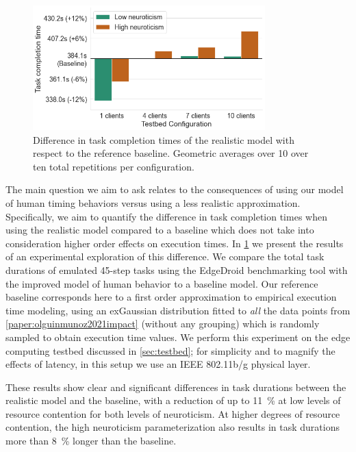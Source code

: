 \begin{figure}
    \centering
    \includegraphics[height=13em]{Figs/2023EdgeDroid2/task_durations_diff}
    \caption{Difference in task completion times of the realistic model with respect to the reference baseline.
    Geometric averages over \num{10} over ten total repetitions per configuration.}\label{fig:taskcompletiontimesdiff}
\end{figure}

The main question we aim to ask relates to the consequences of using our model of human timing behaviors versus using a less realistic approximation.
Specifically, we aim to quantify the difference in task completion times when using the realistic model compared to a baseline which does not take into consideration higher order effects on execution times.
In \cref{fig:taskcompletiontimesdiff} we present the results of an experimental exploration of this difference.
We compare the total task durations of emulated \num{45}-step tasks using the EdgeDroid benchmarking tool with the improved model of human behavior to a baseline model.
Our reference baseline corresponds here to a first order approximation to empirical execution time modeling, using an \gls{exGaussian} distribution fitted to \emph{all} the data points from \cref{paper:olguinmunoz2021impact} (without any grouping) which is randomly sampled to obtain execution time values.
We perform this experiment on the edge computing testbed discussed in \cref{sec:testbed};
for simplicity and to magnify the effects of latency, in this setup we use an \acs{IEEE} \num{802.11}b/g physical layer.

These results show clear and significant differences in task durations between the realistic model and the baseline, with a reduction of up to \SI{11}{\percent} at low levels of resource contention for both levels of neuroticism.
At higher degrees of resource contention, the high neuroticism parameterization also results in task durations more than \SI{8}{\percent} longer than the baseline.



